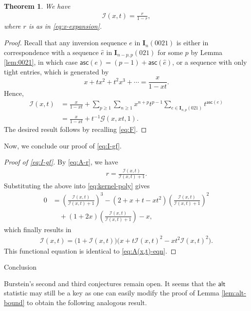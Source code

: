 \documentclass[reqno]{amsart}
\makeatletter
\numberwithin{equation}{section}
\theoremstyle{plain}
\newtheorem{theorem}{Theorem}[section]
\theoremstyle{definition}
\theoremstyle{named}
\def\section{\@startsection{section}{1}
  \z@{.7\linespacing\@plus\linespacing}{.5\linespacing}

  {\normalfont\scshape}}
\newcommand{\bI}{\mathbf{I}}
\newcommand{\asc}{\mathsf{asc}}
\newcommand{\alt}{\mathsf{alt}}
\newcommand{\cG}{\mathcal{G}}
\newcommand{\cI}{\mathcal{I}}
\makeatother
\begin{document}
\begin{theorem}
	We have
	\begin{align}\label{eq:A-r}
		\cI(x,t) = \frac{r}{1-r},
	\end{align}
	where $r$ is as in \eqref{eq:x-expansion}.
\end{theorem}

\begin{proof}
	Recall that any inversion sequence $e$ in $\bI_n(0021)$ is either in correspondence with a sequence $\hat{e}$ in $\bI_{n-p,p}(021)$ for some $p$ by Lemma \ref{lem:0021}, in which case $\asc(e)=(p-1)+\asc(\hat{e})$, or a sequence with only tight entries, which is generated by
	$$x+t x^2+t^2 x^3+\cdots = \frac{x}{1-xt}.$$
	Hence,
	\begin{align*}
		\cI(x,t)&=\frac{x}{1-xt}+\sum_{p\ge 1}\sum_{n\ge 1}x^{n+p}t^{p-1} \sum_{e\in\bI_{n,p}(021)}t^{\asc(e)}\\
		&=\frac{x}{1-xt}+t^{-1}\cG(x,xt,1).
	\end{align*}
	The desired result follows by recalling \eqref{eq:F}.
\end{proof}

Now, we conclude our proof of \eqref{eq:I-gf}.

\begin{proof}[Proof of \eqref{eq:I-gf}]
	By \eqref{eq:A-r}, we have
	\begin{align*}
		r=\frac{\cI(x,t)}{\cI(x,t)+1}.
	\end{align*}
	Substituting the above into \eqref{eq:kernel-poly} gives
	\begin{align*}
		0&=\left(\frac{\cI(x,t)}{\cI(x,t)+1}\right)^3-(2+x+t-xt^2)\left(\frac{\cI(x,t)}{\cI(x,t)+1}\right)^2\\
		&\quad+(1+2x)\left(\frac{\cI(x,t)}{\cI(x,t)+1}\right)-x,
	\end{align*}
	which finally results in
	\begin{align*}
		\cI(x,t)=\big(1+\cI(x,t)\big)\big(x+t \cI(x,t)^2 - xt^2 \cI(x,t)^2\big).
	\end{align*}
	This functional equation is identical to \eqref{eq:A(x,t)-eqn}.
\end{proof}

\section{Conclusion}

Burstein's second and third conjectures remain open. It seems that the $\alt$ statistic may still be a key as one can easily modify the proof of Lemma \ref{lem:alt-bound} to obtain the following analogous result.
\end{document}
